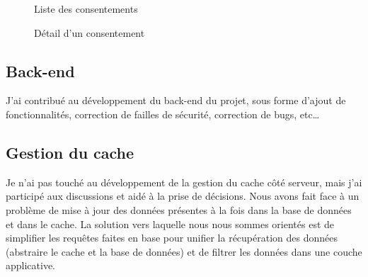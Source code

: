 \documentclass[12pt, a4paper]{report}
\begin{document}
            \begin{figure}[H]
                \begin{center}
                \end{center}
                \caption{Liste des consentements}
            \end{figure}
            \begin{figure}[H]
                \begin{center}
                \end{center}
                \caption{Détail d'un consentement}
            \end{figure}
            \newpage
        \subsection{Back-end}
            J'ai contribué au développement du back-end du projet, sous forme d'ajout de fonctionnalités, correction de failles de sécurité, correction de bugs, etc\ldots
        \subsection{Gestion du cache}
            Je n'ai pas touché au développement de la gestion du cache côté serveur, mais j'ai participé aux discussions et aidé à la prise de décisions.
            Nous avons fait face à un problème de mise à jour des données présentes à la fois dans la base de données et dans le cache. La solution vers laquelle nous nous sommes orientés est de simplifier les requêtes faites en base pour unifier la récupération des données (abstraire le cache et la base de données) et de filtrer les données dans une couche applicative.
\end{document}

